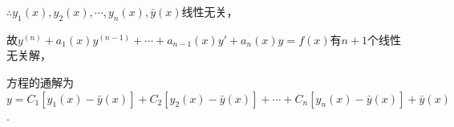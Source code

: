 \documentclass[12pt,UTF8]{ctexart}
\begin{document}
\begin{enumerate}
$\therefore y_1(x),y_2(x),\cdots,y_n(x),\bar y(x)$线性无关，

故$y^{(n)}+a_1(x)y^{(n-1)}+\cdots+a_{n-1}(x)y'+a_n(x)y=f(x)$有$n+1$个线性无关解，

方程的通解为$y=C_1[y_1(x)-\bar y(x)]+C_2[y_2(x)-\bar y(x)]+\cdots+C_{n}[y_n(x)-\bar y(x)]+\bar y(x)$.
%
%

\end{enumerate}
\end{document}
